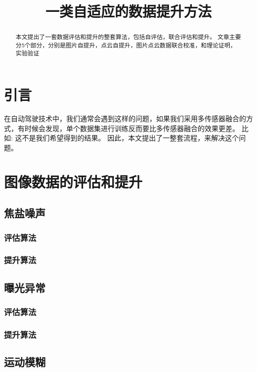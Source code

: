 \documentclass{amsart}
\title{一类自适应的数据提升方法}
\author{}
\date{}
\begin{document}
\maketitle
\begin{abstract}
  本文提出了一套数据评估和提升的整套算法，包括自评估，联合评估和提升。
  文章主要分5个部分，分别是图片自提升，点云自提升，图片点云数据联合校准，和理论证明，实验验证
\end{abstract}

\section{引言}
在自动驾驶技术中，我们通常会遇到这样的问题，如果我们采用多传感器融合的方式，有时候会发现，单个数据集进行训练反而要比多传感器融合的效果更差。
比如:
这不是我们希望得到的结果。
因此，本文提出了一整套流程，来解决这个问题。

\section{图像数据的评估和提升}
\subsection{焦盐噪声}

\subsubsection{评估算法}
\label{sec:0101}

\subsubsection{提升算法}
\label{sec:0102}



\subsection{曝光异常}
\subsubsection{评估算法}
\label{sec:0101}

\subsubsection{提升算法}
\label{sec:0102}
\subsection{运动模糊}
\end{document}
